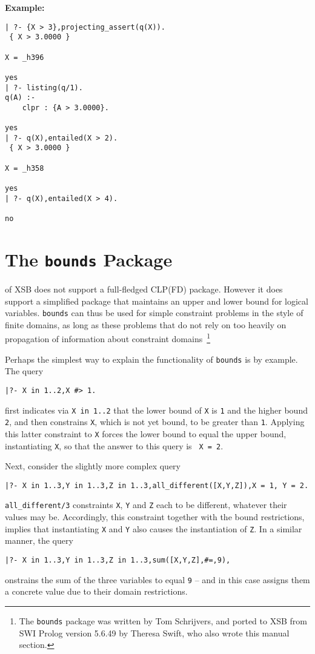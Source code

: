 \begin{description}
{\bf Example:}
{\small
\begin{verbatim}
| ?- {X > 3},projecting_assert(q(X)).
 { X > 3.0000 }

X = _h396

yes
| ?- listing(q/1).
q(A) :-
    clpr : {A > 3.0000}.

yes
| ?- q(X),entailed(X > 2).
 { X > 3.0000 }

X = _h358

yes
| ?- q(X),entailed(X > 4).

no
\end{verbatim}
}
\end{description}

\section{The {\tt bounds} Package} \label{sec:bounds}
%

\version{} of XSB does not support a full-fledged CLP(FD) package.
However it does support a simplified package that maintains an upper
and lower bound for logical variables.  {\tt bounds} can thus be used
for simple constraint problems in the style of finite domains, as long
as these problems that do not rely on too heavily on propagation of
information about constraint domains~\footnote{The {\tt bounds}
  package was written by Tom Schrijvers, and ported to XSB from SWI
  Prolog version 5.6.49 by Theresa Swift, who also wrote this manual
  section.}

Perhaps the simplest way to explain the functionality of {\tt bounds}
is by example.  The query
%
{\small
\begin{verbatim}
|?- X in 1..2,X #> 1.
\end{verbatim}
}
%
\noindent
first indicates via {\tt X in 1..2} that the lower bound of {\tt X} is
{\tt 1} and the higher bound {\tt 2}, and then constrains {\tt X},
which is not yet bound, to be greater than {\tt 1}.  Applying this
latter constraint to {\tt X} forces the lower bound to equal the upper
bound, instantiating {\tt X}, so that the answer to this query is {\tt
  X = 2}.

Next, consider the slightly more complex query
%
{\small
\begin{verbatim}
|?- X in 1..3,Y in 1..3,Z in 1..3,all_different([X,Y,Z]),X = 1, Y = 2.
\end{verbatim}
}
%
\noindent
{\tt all\_different/3} constraints {\tt X}, {\tt Y} and {\tt Z} each
to be different, whatever their values may be.  Accordingly, this
constraint together with the bound restrictions, implies that
instantiating {\tt X} and {\tt Y} also causes the instantiation of
{\tt Z}.  In a similar manner, the query
%
{\small
\begin{verbatim}
|?- X in 1..3,Y in 1..3,Z in 1..3,sum([X,Y,Z],#=,9),
\end{verbatim}
}
%
\noindent
onstrains the sum of the three variables to equal {\tt 9} -- and in
this case assigns them a concrete value due to their domain
restrictions.

